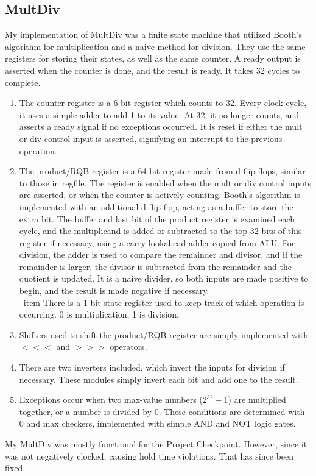\documentclass[letterpaper]{article} %
\begin{document}
\subsection*{MultDiv}
My implementation of MultDiv was a finite state machine that utilized Booth's algorithm for multiplication and a naive method for division. They use the same registers for storing their states, as well as the same counter. A ready output is asserted when the counter is done, and the result is ready. It takes 32 cycles to complete. \\
\begin{enumerate}
\item The counter register is a 6-bit register which counts to 32. Every clock cycle, it uses a simple adder to add 1 to its value. At 32, it no longer counts, and asserts a ready signal if no exceptions occurred. It is reset if either the mult or div control input is asserted, signifying an interrupt to the previous operation. \\
\item The product/RQB register is a 64 bit register made from d flip flops, similar to those in regfile. The register is enabled when the mult or div control inputs are asserted, or when the counter is actively counting. Booth's algorithm is implemented with an additional d flip flop, acting as a buffer to store the extra bit. The buffer and last bit of the product register is examined each cycle, and the multiplicand is added or subtracted to the top 32 bits of this register if necessary, using a carry lookahead adder copied from ALU. For division, the adder is used to compare the remainder and divisor, and if the remainder is larger, the divisor is subtracted from the remainder and the quotient is updated. It is a naive divider, so both inputs are made positive to begin, and the result is made negative if necessary. \\
\ item There is a 1 bit state register used to keep track of which operation is occurring. 0 is multiplication, 1 is division. \\
\item Shifters used to shift the product/RQB register are simply implemented with $<<<$ and $>>>$ operators. \\
\item There are two inverters included, which invert the inputs for division if necessary. These modules simply invert each bit and add one to the result.
\item Exceptions occur when two max-value numbers (\(2^{32}-1\)) are multiplied together, or a number is divided by 0. These conditions are determined with 0 and max checkers, implemented with simple AND and NOT logic gates. \\
\end{enumerate}
My MultDiv was mostly functional for the Project Checkpoint. However, since it was not negatively clocked, causing hold time violations. That has since been fixed.
\end{document}
